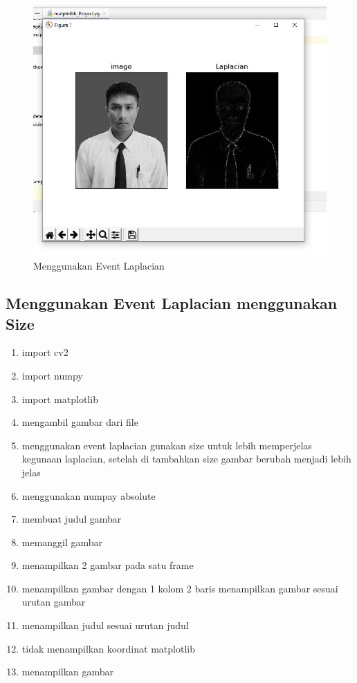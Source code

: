 \newpage
\begin{figure}[ht]
\centering
\includegraphics[scale=0.6]{figures/2,64.jpg}
\caption{Menggunakan Event Laplacian}
\label{contoh}
\end{figure}






\newpage
\subsection{Menggunakan Event Laplacian menggunakan Size}

\begin{enumerate}
	\item import cv2
	\item import numpy
	\item import matplotlib
	\item mengambil gambar dari file
	\item menggunakan event laplacian gunakan size untuk lebih memperjelas kegunaan laplacian, setelah di tambahkan size gambar berubah menjadi lebih jelas
	\item menggunakan numpay absolute
	\item membuat judul gambar
	\item memanggil gambar
	\item menampilkan 2 gambar pada satu frame
	\item menampilkan gambar dengan 1 kolom 2 baris menampilkan gambar sesuai urutan gambar
	\item menampilkan judul sesuai urutan judul
	\item tidak menampilkan koordinat matplotlib
	\item menampilkan gambar
\end{enumerate}

